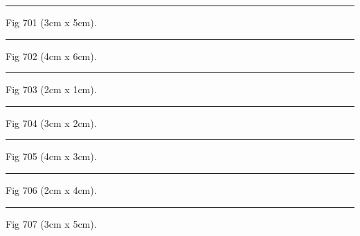 \documentclass[a4paper,11pt]{article}
\begin{document}
\begin{swarmwrap}%
  \begin{minipage}[t]{3cm}
    \centering
    \rule{\linewidth}{5cm}
    {\footnotesize Fig 701 (3cm x 5cm).}
  \end{minipage}%
\end{swarmwrap}%
\swarmwrapnext
\lipsum[101]%

\begin{swarmwrap}%
  \begin{minipage}[t]{4cm}
    \centering
    \rule{\linewidth}{6cm}
    {\footnotesize Fig 702 (4cm x 6cm).}
  \end{minipage}%
\end{swarmwrap}%
\swarmwrapnext
\lipsum[102]%

\begin{swarmwrap}%
  \begin{minipage}[t]{2cm}
    \centering
    \rule{\linewidth}{1cm}
    {\footnotesize Fig 703 (2cm x 1cm).}
  \end{minipage}%
\end{swarmwrap}%
\swarmwrapnext
\lipsum[103]%

\begin{swarmwrap}%
  \begin{minipage}[t]{3cm}
    \centering
    \rule{\linewidth}{2cm}
    {\footnotesize Fig 704 (3cm x 2cm).}
  \end{minipage}%
\end{swarmwrap}%
\swarmwrapnext
\lipsum[104]%

\begin{swarmwrap}%
  \begin{minipage}[t]{4cm}
    \centering
    \rule{\linewidth}{3cm}
    {\footnotesize Fig 705 (4cm x 3cm).}
  \end{minipage}%
\end{swarmwrap}%
\swarmwrapnext
\lipsum[105]%

\begin{swarmwrap}%
  \begin{minipage}[t]{2cm}
    \centering
    \rule{\linewidth}{4cm}
    {\footnotesize Fig 706 (2cm x 4cm).}
  \end{minipage}%
\end{swarmwrap}%
\swarmwrapnext
\lipsum[106]%

\begin{swarmwrap}%
  \begin{minipage}[t]{3cm}
    \centering
    \rule{\linewidth}{5cm}
    {\footnotesize Fig 707 (3cm x 5cm).}
  \end{minipage}%
\end{swarmwrap}%
\swarmwrapnext
\lipsum[107]%
\end{document}
